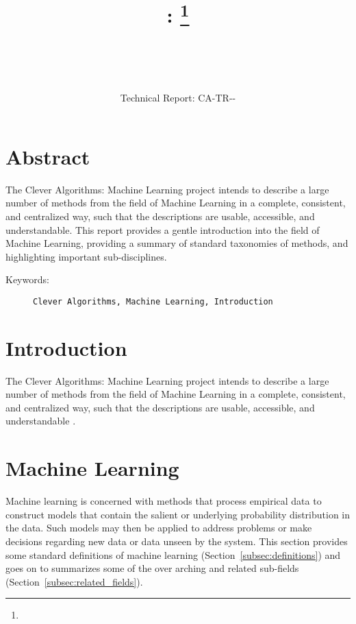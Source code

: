 \documentclass[a4paper, 11pt]{article}
\title{{\myreporttitle}: {\myreportsubtitle}\footnote{\myreportlicense}}
\author{\myreportauthor\\{\myreportemail}\\\small\myreportproject}
\date{\myreportfulldate\\{\small{Technical Report: CA-TR-{\myreportdate}-\myreportversion}}}
\begin{document}
\maketitle

\section*{Abstract} 
The Clever Algorithms: Machine Learning project intends to describe a large number of methods from the field of Machine Learning in a complete, consistent, and centralized way, such that the descriptions are usable, accessible, and understandable.
This report provides a gentle introduction into the field of Machine Learning, providing a summary of standard taxonomies of methods, and highlighting important sub-disciplines. 

\begin{description}
	\item[Keywords:] {\small\texttt{Clever Algorithms, Machine Learning, Introduction}}
\end{description} 

\section{Introduction}
\label{sec:introduction}
The Clever Algorithms: Machine Learning project intends to describe a large number of methods from the field of Machine Learning in a complete, consistent, and centralized way, such that the descriptions are usable, accessible, and understandable \cite{Brownlee2011a}.



%
%
\section{Machine Learning}
\label{sec:machine_learning}
Machine learning is concerned with methods that process empirical data to construct models that contain the salient or underlying probability distribution in the data. Such models may then be applied to address problems or make decisions regarding new data or data unseen by the system.
This section provides some standard definitions of machine learning (Section~\ref{subsec:definitions}) and goes on to summarizes some of the over arching and related sub-fields (Section~\ref{subsec:related_fields}).
\end{document}
